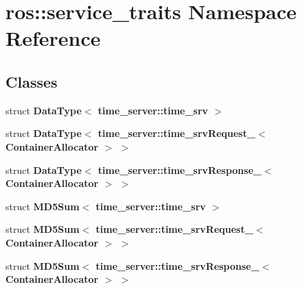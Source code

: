 \section{ros\-:\-:service\-\_\-traits \-Namespace \-Reference}
\label{namespaceros_1_1service__traits}
\subsection*{\-Classes}
\begin{DoxyCompactItemize}
\item 
struct {\bf \-Data\-Type$<$ time\-\_\-server\-::time\-\_\-srv $>$}
\item 
struct {\bf \-Data\-Type$<$ time\-\_\-server\-::time\-\_\-srv\-Request\-\_\-$<$ Container\-Allocator $>$ $>$}
\item 
struct {\bf \-Data\-Type$<$ time\-\_\-server\-::time\-\_\-srv\-Response\-\_\-$<$ Container\-Allocator $>$ $>$}
\item 
struct {\bf \-M\-D5\-Sum$<$ time\-\_\-server\-::time\-\_\-srv $>$}
\item 
struct {\bf \-M\-D5\-Sum$<$ time\-\_\-server\-::time\-\_\-srv\-Request\-\_\-$<$ Container\-Allocator $>$ $>$}
\item 
struct {\bf \-M\-D5\-Sum$<$ time\-\_\-server\-::time\-\_\-srv\-Response\-\_\-$<$ Container\-Allocator $>$ $>$}
\end{DoxyCompactItemize}
